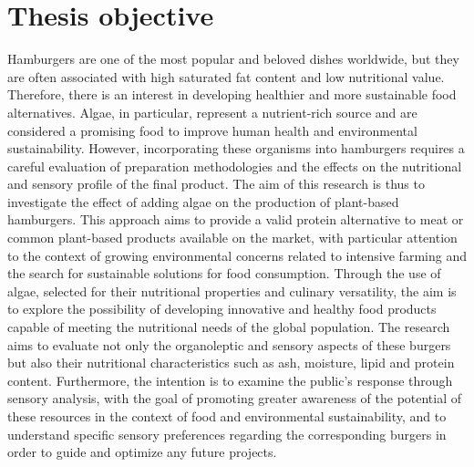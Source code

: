 
\section{Thesis objective}
Hamburgers are one of the most popular and beloved dishes worldwide, but they are often associated with high saturated fat content and low nutritional value. Therefore, there is an interest in developing healthier and more sustainable food alternatives. Algae, in particular, represent a nutrient-rich source and are considered a promising food to improve human health and environmental sustainability. However, incorporating these organisms into hamburgers requires a careful evaluation of preparation methodologies and the effects on the nutritional and sensory profile of the final product. The aim of this research is thus to investigate the effect of adding algae on the production of plant-based hamburgers. This approach aims to provide a valid protein alternative to meat or common plant-based products available on the market, with particular attention to the context of growing environmental concerns related to intensive farming and the search for sustainable solutions for food consumption. Through the use of algae, selected for their nutritional properties and culinary versatility, the aim is to explore the possibility of developing innovative and healthy food products capable of meeting the nutritional needs of the global population. The research aims to evaluate not only the organoleptic and sensory aspects of these burgers but also their nutritional characteristics such as ash, moisture, lipid and protein content. Furthermore, the intention is to examine the public's response through sensory analysis, with the goal of promoting greater awareness of the potential of these resources in the context of food and environmental sustainability, and to understand specific sensory preferences regarding the corresponding burgers in order to guide and optimize any future projects.
